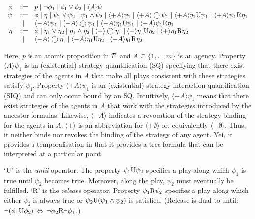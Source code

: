 \noindent
$\begin{array}{rcl}
\phi    & ::= & p\;|\; \neg\phi_1 \;|\; \phi_1\vee \phi_2
    \;|\; \langle  A\rangle \psi
    \\
\psi  & ::= & \phi \;|\; \eta \;|\; \psi_1\vee \psi_2\;|\; \psi_1\wedge \psi_2
    \;|\; \langle+A\rangle \psi_1
    \;|\; \langle+A\rangle\bigcirc\psi_1 
    \;|\; \langle+A\rangle\eta_1\textrm{U} \psi_1
    \;|\; \langle+A\rangle\psi_1\textrm{R} \eta_1 \\
    & | & \langle-A\rangle \psi_1
    \;|\; \langle-A\rangle\bigcirc\psi_1 
    \;|\; \langle-A\rangle\eta_1\textrm{U} \psi_1
    \;|\; \langle-A\rangle\psi_1\textrm{R} \eta_1 
    \\
\eta  & ::= & \phi \;|\; \eta_1\vee \eta_2\;|\; \eta_1\wedge \eta_2
    \;|\; \langle+\rangle\bigcirc\eta_1 
    \;|\; \langle+\rangle\eta_1\textrm{U} \eta_2
    \;|\; \langle+\rangle\eta_1\textrm{R} \eta_2 \\
    & | & \langle-A\rangle\bigcirc\eta_1 
    \;|\; \langle-A\rangle\eta_1\textrm{U} \eta_2
    \;|\; \langle-A\rangle\eta_1\textrm{R} \eta_2 
\end{array}$
\smallskip

Here, $p$ is an atomic proposition in ${\cal P}$ and $A\subseteq \{1,\ldots,m\}$ is an agency.  
Property $\langle A\rangle\psi_1$ is an (existential) 
strategy quantification (SQ) specifying that
there exist strategies of the agents in $A$
that make all plays consistent with these strategies satisfy $\psi_1$.
Property $\langle+A\rangle\psi_1$ is an (existential) 
strategy interaction quantification (SIQ) and 
can only occur bound by an SQ.
Intuitively, $\langle+A\rangle\psi_1$ means that there exist strategies of the agents in $A$
that work with the strategies introduced by the ancestor formulas.
Likewise, $\langle -A \rangle$ indicates a revocation of the strategy binding for the agents in $A$.
$\langle + \rangle$ is an abbreviation for $\langle + \emptyset\rangle$ or, equivalently $\langle - \emptyset \rangle$.
Thus, it neither binds nor revokes the binding of the strategy of any agent.
Yet, it provides a temporalisation in that it provides a tree formula that can be interpreted at a particular point.


`$\textrm{U}$' is the {\em until} operator.  
The property $\psi_1\textrm{U}\psi_2$ specifies a play along which 
$\psi_1$ is true until $\psi_2$ becomes true.  
Moreover, along the play, $\psi_2$ must eventually be fulfilled.   
`$\textrm{R}$' is the {\em release} operator.  
Property $\psi_1\textrm{R}\psi_2$ specifies a play along which either 
$\psi_2$ is always true or $\psi_2\textrm{U}(\psi_1\wedge\psi_2)$ 
is satisfied. (Release is dual to until: $\neg(\phi_1 \textrm{U} \phi_2) \, \Leftrightarrow \, \neg \phi_2 \textrm{R} \neg \phi_1$.)

